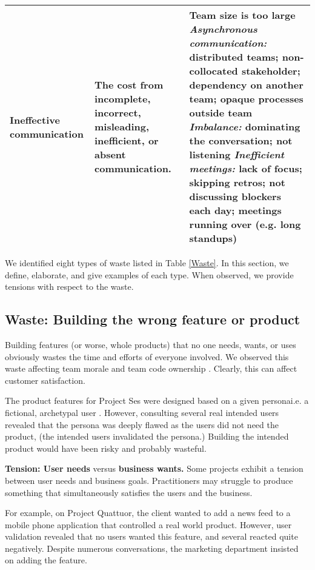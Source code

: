 \begin{table}[t]
\begin{tabular}{|p{1.5in}|p{1.6in}|p{2.8in}|}
Ineffective communication             & The cost from incomplete, incorrect, misleading, inefficient, or absent communication.                         & Team size is too large \newline \textit{Asynchronous communication:} distributed teams; non-collocated stakeholder; dependency on another team; opaque processes outside team \newline \textit{Imbalance:} dominating the conversation; not listening \newline \textit{Inefficient meetings:} lack of focus; skipping retros; not discussing blockers each day; meetings running over (e.g. long standups) \\ \hline                  
\end{tabular}
\end{table}

We identified eight types of waste listed in Table \ref{Waste}. In this section, we define, elaborate, and give examples of each type. When observed, we provide tensions with respect to the waste.
\subsection{Waste: Building the wrong feature or product}
Building features (or worse, whole products) that no one needs, wants, or uses obviously wastes the time and efforts of everyone involved. We observed this waste affecting team morale and team code ownership \cite{SedanoTeamCodeOwnership}. Clearly, this can affect customer satisfaction. 

The product features for Project Ses were designed based on a given persona\textemdash i.e. a fictional, archetypal user \cite{Grudin2002personas}. However, consulting several real intended users revealed that the persona was deeply flawed as the users did not need the product, (the intended users invalidated the persona.) Building the intended product would have been risky and probably wasteful. 

\textbf{Tension: User needs} versus \textbf{business wants.}
Some projects exhibit a tension between user needs and business goals. Practitioners may struggle to produce something that simultaneously satisfies the users and the business.

For example, on Project Quattuor, the client wanted to add a news feed to a mobile phone application that controlled a real world product. However, user validation revealed that no users wanted this feature, and several reacted quite negatively. Despite numerous conversations, the marketing department insisted on adding the feature. 
